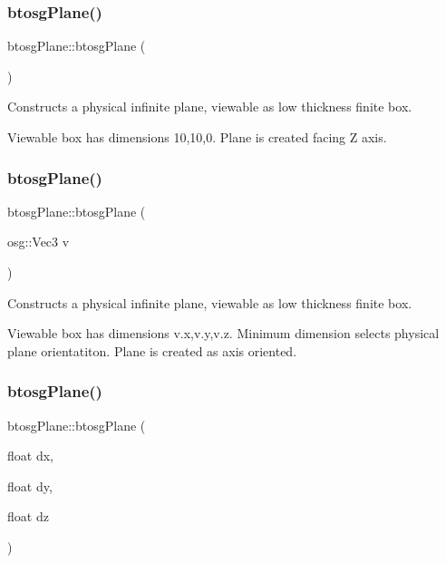 \subsubsection{\texorpdfstring{btosg\+Plane()}{btosgPlane()}\hspace{0.1cm}{\footnotesize\ttfamily [1/3]}}
{\footnotesize\ttfamily btosg\+Plane\+::btosg\+Plane (\begin{DoxyParamCaption}{ }\end{DoxyParamCaption})\hspace{0.3cm}{\ttfamily [inline]}}

Constructs a physical infinite plane, viewable as low thickness finite box.

Viewable box has dimensions 10,10,0. Plane is created facing Z axis. \mbox{\label{classbtosgPlane_a4bc8b74d62426eb5fa66355b71569db2}} 
\subsubsection{\texorpdfstring{btosg\+Plane()}{btosgPlane()}\hspace{0.1cm}{\footnotesize\ttfamily [2/3]}}
{\footnotesize\ttfamily btosg\+Plane\+::btosg\+Plane (\begin{DoxyParamCaption}\item[{osg\+::\+Vec3}]{v }\end{DoxyParamCaption})\hspace{0.3cm}{\ttfamily [inline]}}

Constructs a physical infinite plane, viewable as low thickness finite box.

Viewable box has dimensions v.\+x,v.\+y,v.\+z. Minimum dimension selects physical plane orientatiton. Plane is created as axis oriented. \mbox{\label{classbtosgPlane_a295ebe4cb55a2786764c7840d10895f4}} 
\subsubsection{\texorpdfstring{btosg\+Plane()}{btosgPlane()}\hspace{0.1cm}{\footnotesize\ttfamily [3/3]}}
{\footnotesize\ttfamily btosg\+Plane\+::btosg\+Plane (\begin{DoxyParamCaption}\item[{float}]{dx,  }\item[{float}]{dy,  }\item[{float}]{dz }\end{DoxyParamCaption})\hspace{0.3cm}{\ttfamily [inline]}}

